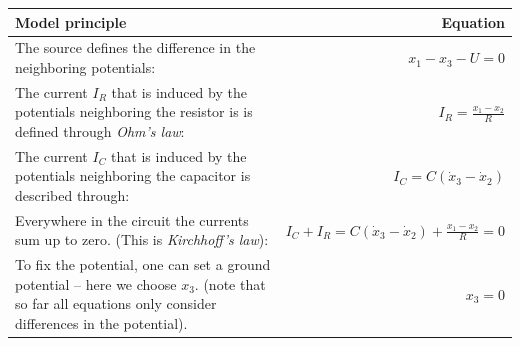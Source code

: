 \documentclass[]{book}
\theoremstyle{definition}
\theoremstyle{definition}
\theoremstyle{definition}
\theoremstyle{remark}
\begin{document}
\begin{longtable}[]{@{}lr@{}}
\toprule
\begin{minipage}[b]{0.66\columnwidth}\raggedright
Model principle\strut
\end{minipage} & \begin{minipage}[b]{0.28\columnwidth}\raggedleft
Equation\strut
\end{minipage}\tabularnewline
\midrule
\endhead
\begin{minipage}[t]{0.66\columnwidth}\raggedright
The source defines the difference in the neighboring potentials:\strut
\end{minipage} & \begin{minipage}[t]{0.28\columnwidth}\raggedleft
\(x_1 - x_3 - U = 0\)\strut
\end{minipage}\tabularnewline
\begin{minipage}[t]{0.66\columnwidth}\raggedright
The current \(I_R\) that is induced by the potentials neighboring the resistor is is defined through \emph{Ohm's law}:\strut
\end{minipage} & \begin{minipage}[t]{0.28\columnwidth}\raggedleft
\(I_R = \frac{x_1 - x_2}{R}\)\strut
\end{minipage}\tabularnewline
\begin{minipage}[t]{0.66\columnwidth}\raggedright
The current \(I_C\) that is induced by the potentials neighboring the capacitor is described through:\strut
\end{minipage} & \begin{minipage}[t]{0.28\columnwidth}\raggedleft
\(I_C = C(\dot x_3 - \dot x_2)\)\strut
\end{minipage}\tabularnewline
\begin{minipage}[t]{0.66\columnwidth}\raggedright
Everywhere in the circuit the currents sum up to zero. (This is \emph{Kirchhoff's law}):\strut
\end{minipage} & \begin{minipage}[t]{0.28\columnwidth}\raggedleft
\(I_C + I_R = C(\dot x_3 - \dot x_2)+ \frac{x_1 - x_2}{R}=0\)\strut
\end{minipage}\tabularnewline
\begin{minipage}[t]{0.66\columnwidth}\raggedright
To fix the potential, one can set a ground potential -- here we choose \(x_3\). (note that so far all equations only consider differences in the potential).\strut
\end{minipage} & \begin{minipage}[t]{0.28\columnwidth}\raggedleft
\(x_3 = 0\)\strut
\end{minipage}\tabularnewline
\bottomrule
\end{longtable}
\end{document}

